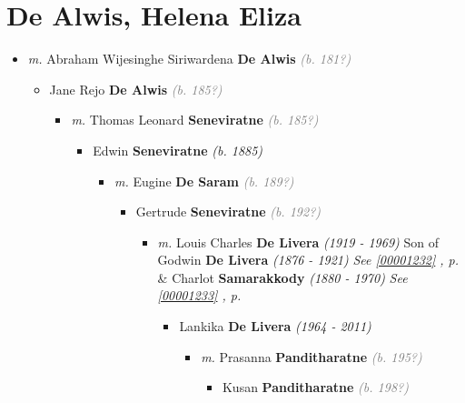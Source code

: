 \documentclass[10pt, openany]{book}
\begin{document}
\chapter{De Alwis, Helena Eliza}
\label{00002223}
\textcolor{slmaroon}{\textit{}}
\begin{itemize}
\item{\textit{m.} Abraham Wijesinghe Siriwardena \textbf{De Alwis} \textcolor{gray}{\textit{(b. 181?)}}   \label{couple:00002223:00002224} \begin{itemize}
\item{Jane Rejo \textbf{De Alwis} \textcolor{gray}{\textit{(b. 185?)}}
\begin{itemize}
\item{\textit{m.} Thomas Leonard \textbf{Seneviratne} \textcolor{gray}{\textit{(b. 185?)}}   \label{couple:00002225:00002226} \begin{itemize}
\item{Edwin \textbf{Seneviratne} \textcolor{slorange}{\textit{(b. 1885)}}
\begin{itemize}
\item{\textit{m.} Eugine \textbf{De Saram} \textcolor{gray}{\textit{(b. 189?)}}   \label{couple:00002227:00002228} \begin{itemize}
\item{Gertrude \textbf{Seneviratne} \textcolor{gray}{\textit{(b. 192?)}}
\begin{itemize}
\item{\textit{m.} Louis Charles  \textbf{De Livera} \textcolor{slorange}{\textit{(1919 - 1969)}} Son of  Godwin \textbf{De Livera} \textcolor{slorange}{\textit{(1876 - 1921)}} \textcolor{slteal}{\textit{See  \autoref{00001232} \textit{, p. \pageref{00001232} }}}  \&  Charlot \textbf{Samarakkody} \textcolor{slorange}{\textit{(1880 - 1970)}} \textcolor{slteal}{\textit{See  \autoref{00001233} \textit{, p. \pageref{00001233} }}}   \label{couple:00001260:00001261} \begin{itemize}
\item{Lankika \textbf{De Livera} \textcolor{slorange}{\textit{(1964 - 2011)}}
\begin{itemize}
\item{\textit{m.} Prasanna \textbf{Panditharatne} \textcolor{gray}{\textit{(b. 195?)}}   \label{couple:00001267:00001268} \begin{itemize}
\item{Kusan \textbf{Panditharatne} \textcolor{gray}{\textit{(b. 198?)}}
 }
\end{itemize}}

\end{itemize}}
\end{itemize}}
\end{itemize}}
\end{itemize}}
\end{itemize}}
\end{itemize}}
\end{itemize}}
\end{itemize}}
\end{itemize}
\end{document}

